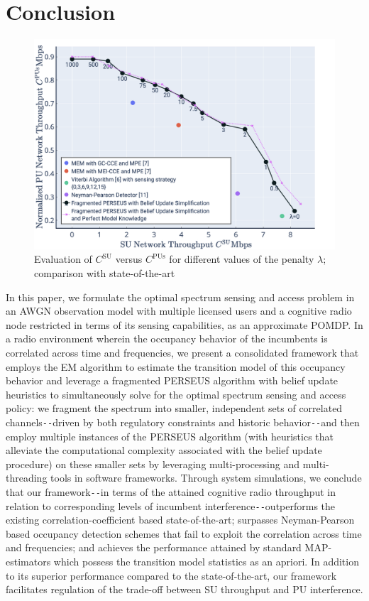 \documentclass[10pt,twocolumn]{IEEEtran}
\begin{document}
\section{Conclusion}\label{V}
\begin{figure}
    \centering
    \includegraphics[width=1.0\linewidth]{SU_Throughput_PU_Interference_Varying_Penalty.png}
    \caption{Evaluation of $C^{\text{SU}}$ versus $C^{\text{PUs}}$ for different values of the penalty $\lambda$; comparison with state-of-the-art}
    \label{fig:8}
\end{figure}
In this paper, we formulate the optimal spectrum sensing and access problem in an AWGN observation model with multiple licensed users and a cognitive radio node restricted in terms of its sensing capabilities, as an approximate POMDP. In a radio environment wherein the occupancy behavior of the incumbents is correlated across time and frequencies, we present a consolidated framework that employs the EM algorithm to estimate the transition model of this occupancy behavior and leverage a fragmented PERSEUS algorithm with belief update heuristics to simultaneously solve for the optimal spectrum sensing and access policy: we fragment the spectrum into smaller, independent sets of correlated channels\texttt{-{}-}driven by both regulatory constraints and historic behavior\texttt{-{}-}and then employ multiple instances of the PERSEUS algorithm (with heuristics that alleviate the computational complexity associated with the belief update procedure) on these smaller sets by leveraging multi-processing and multi-threading tools in software frameworks. Through system simulations, we conclude that our framework\texttt{-{}-}in terms of the attained cognitive radio throughput in relation to corresponding levels of incumbent interference\texttt{-{}-}outperforms the existing correlation-coefficient based state-of-the-art; surpasses Neyman-Pearson based occupancy detection schemes that fail to exploit the correlation across time and frequencies; and achieves the performance attained by standard MAP-estimators which possess the transition model statistics as an apriori. In addition to its superior performance compared to the state-of-the-art, our framework facilitates regulation of the trade-off between SU throughput and PU interference.


\end{document}
